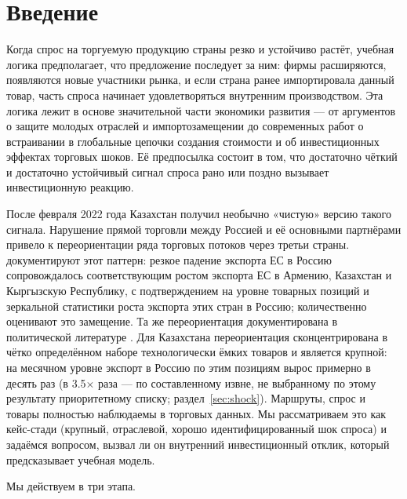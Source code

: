 \documentclass[12pt]{article}
\begin{document}
\clearpage

\section{Введение}

Когда спрос на торгуемую продукцию страны резко и устойчиво растёт, учебная логика
предполагает, что предложение последует за ним: фирмы расширяются, появляются новые
участники рынка, и если страна ранее импортировала данный товар, часть спроса начинает
удовлетворяться внутренним производством. Эта логика лежит в основе значительной части
экономики развития — от аргументов о защите молодых отраслей и импортозамещении до
современных работ о встраивании в глобальные цепочки создания стоимости и об
инвестиционных эффектах торговых шоков. Её предпосылка состоит в том, что достаточно
чёткий и достаточно устойчивый сигнал спроса рано или поздно вызывает инвестиционную
реакцию.

После февраля 2022 года Казахстан получил необычно «чистую» версию такого сигнала.
Нарушение прямой торговли между Россией и её основными партнёрами привело к
переориентации ряда торговых потоков через третьи страны. \citet{chupilkin2026roundabout}
документируют этот паттерн: резкое падение экспорта ЕС в Россию сопровождалось
соответствующим ростом экспорта ЕС в Армению, Казахстан и Кыргызскую Республику, с
подтверждением на уровне товарных позиций и зеркальной статистики роста экспорта этих
стран в Россию; \citet{chupilkin2025intermediated} количественно оценивают это замещение.
Та же переориентация документирована в политической литературе
\citep{simola2023bofit,kse2024exportcontrols,wisniewska2025osw}. Для Казахстана
переориентация сконцентрирована в чётко определённом наборе технологически ёмких товаров
и является крупной: на месячном уровне экспорт в Россию по этим позициям вырос примерно в
десять раз (в 3.5$\times$ раза — по составленному извне, не выбранному по этому
результату приоритетному списку; раздел~\ref{sec:shock}). Маршруты, спрос и товары
полностью наблюдаемы в торговых данных. Мы рассматриваем это как кейс-стади (крупный,
отраслевой, хорошо идентифицированный шок спроса) и задаёмся вопросом, вызвал ли он
внутренний инвестиционный отклик, который предсказывает учебная модель.

Мы действуем в три этапа.
\end{document}
